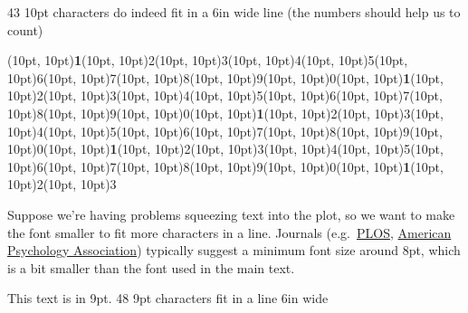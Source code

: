 \documentclass[10,a4paper]{article}
\newcommand{\highlight}[1]{{\color{red}\textbf{1}}}
\begin{document}
{\begin{minipage}{6in}
\vspace{0.7\baselineskip}

43 10pt characters do indeed fit in a 6in wide line (the numbers
should help us to count)

\vspace{0.7\baselineskip}

\framebox(10pt, 10pt){\highlight{1}}\framebox(10pt,
10pt){2}\framebox(10pt, 10pt){3}\framebox(10pt,
10pt){4}\framebox(10pt, 10pt){5}\framebox(10pt,
10pt){6}\framebox(10pt, 10pt){7}\framebox(10pt,
10pt){8}\framebox(10pt, 10pt){9}\noindent\framebox(10pt, 10pt){0}\framebox(10pt, 10pt){\highlight{1}}\framebox(10pt,
10pt){2}\framebox(10pt, 10pt){3}\framebox(10pt,
10pt){4}\framebox(10pt, 10pt){5}\framebox(10pt,
10pt){6}\framebox(10pt, 10pt){7}\framebox(10pt,
10pt){8}\framebox(10pt, 10pt){9}\noindent\framebox(10pt, 10pt){0}\framebox(10pt, 10pt){\highlight{1}}\framebox(10pt,
10pt){2}\framebox(10pt, 10pt){3}\framebox(10pt,
10pt){4}\framebox(10pt, 10pt){5}\framebox(10pt,
10pt){6}\framebox(10pt, 10pt){7}\framebox(10pt,
10pt){8}\framebox(10pt, 10pt){9}\noindent\framebox(10pt, 10pt){0}\framebox(10pt, 10pt){\highlight{1}}\framebox(10pt,
10pt){2}\framebox(10pt, 10pt){3}\framebox(10pt,
10pt){4}\framebox(10pt, 10pt){5}\framebox(10pt,
10pt){6}\framebox(10pt, 10pt){7}\framebox(10pt,
10pt){8}\framebox(10pt, 10pt){9}\framebox(10pt, 10pt){0}\framebox(10pt, 10pt){\highlight{1}}\framebox(10pt,
10pt){2}\framebox(10pt, 10pt){3}

\vspace{0.7\baselineskip}

Suppose we're having problems squeezing text into the plot, so we want
to make the font smaller to fit more characters in a line. Journals (e.g.~\href{https://journals.plos.org/plosone/s/figures\#loc-text-within-figures}{PLOS},
\href{https://apastyle.apa.org/style-grammar-guidelines/paper-format/font}{American
  Psychology Association})
typically suggest a minimum font size around 8pt, which is a bit
smaller than the font used in the main text.

\vspace{0.7\baselineskip}

\fontsize{9}{9}\selectfont

This text is in 9pt. 48 9pt characters fit in a line 6in wide

\vspace{0.7\baselineskip}


\end{minipage}}
\end{document}
